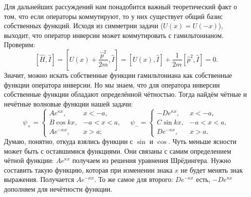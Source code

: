Для дальнейших рассуждений нам понадобится важный теоретический факт о том, что
если операторы коммутируют, то у них существует общий базис собственных
функций. Исходя из симметрии задачи ($U(x) = U(-x)$), выходит, что оператор
инверсии может коммутировать с гамильтонианом. Проверим:
\[
  [\hat{H}, \hat{I}] = [U(x) + \frac{\hat{p}^2}{2m}, \hat{I}] = [U(x), \hat{I}] + \frac{1}{2m} [\hat{p}^2, \hat{I}] = 0.
\]
Значит, можно искать собственные функции гамильтониана как собственные функции
оператора инверсии. Но мы знаем, что для оператора инверсии собственные функции
обладают определённой чётностью. Тогда найдём чётные и нечётные волновые
функции нашей задачи:
\[
  \psi_+ =
  \begin{cases}
    Ae^{\kappa x},& x < -a,\\
    B \cos kx, & -a < x < a,\\
    Ae^{-\kappa x},& x > a;
  \end{cases}\quad
  \psi_- =
  \begin{cases}
    -De^{\kappa x},& x < -a,\\
    C \sin kx, & -a < x < a,\\
    De^{-\kappa x},& x > a.
  \end{cases}
\]
Думаю, понятно, откуда взялись функции с $\sin$ и $\cos$. Чуть меньше ясности
может быть с оставшимися функциями. Они связаны с самим определением чётной
функции: $Ae^{\kappa x}$ получаем из решения уравнения Шрёдингера. Нужно
составить такую функцию, которая при изменении знака $x$ не будет менять знак
выражения. Получается $Ae^{-\kappa x}$. То же самое для второго: $De^{-\kappa
      x}$ есть, $-De^{\kappa x}$ дополняем для нечётности функции.

